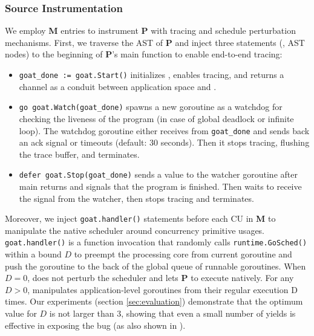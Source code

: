 \subsubsection{Source Instrumentation}

We employ \textbf{M} entries to instrument \textbf{P} with tracing and schedule perturbation mechanisms.
%
First, we traverse the AST of \textbf{P} and inject three statements (\ie, AST nodes) to the beginning of \textbf{P}'s main function to enable end-to-end tracing:
\begin{itemize}
  \item \texttt{goat\_done := goat.Start()} initializes \goat, enables tracing, and returns a channel as a conduit between application space and \goat.
  \item \texttt{go goat.Watch(goat\_done)} spawns a new goroutine as a watchdog for checking the liveness of the program (in case of global deadlock or infinite loop). The watchdog goroutine either receives from \texttt{goat\_done} and sends back an ack signal or timeouts (default: 30 seconds). Then it stops tracing, flushing the trace buffer, and terminates.
  \item \texttt{defer goat.Stop(goat\_done)} sends a value to the watcher goroutine after main returns and signals that the program is finished. Then \goat waits to receive the signal from the watcher, then stops tracing and terminates.
\end{itemize}

Moreover, we inject \texttt{goat.handler()} statements before each CU in \textbf{M} to manipulate the native scheduler around concurrency primitive usages. \texttt{goat.handler()} is a function invocation that randomly calls \texttt{runtime.GoSched()} within a bound $D$ to preempt the processing core from current goroutine and push the goroutine to the back of the global queue of runnable goroutines.
%
When $D=0$, \goat does not perturb the scheduler and lets \textbf{P} to execute natively. For any $D>0$, \goat manipulates application-level goroutines from their regular execution D times.
%
Our experiments (section \ref{sec:evaluation}) demonstrate that the optimum value for $D$ is not larger than 3, showing that even a small number of yields is effective in exposing the bug (as also shown in \cite{burckhardt-depthBug-asplos10}).

